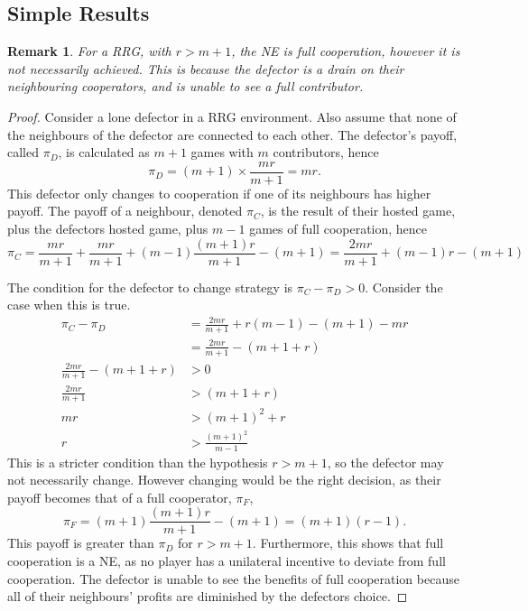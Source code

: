 \subsection{Simple Results}
\newtheorem{remark1}[theorem]{Remark} \label{remark1}
\begin{remark1}
For a RRG, with $r>m+1$, the NE is full cooperation, however it is not necessarily achieved. This is because the defector is a drain on their neighbouring cooperators, and is unable to see a full contributor. 
\end{remark1}
\begin{proof}
Consider a lone defector in a RRG environment. Also assume that none of the neighbours of the defector are connected to each other. The defector's payoff, called $\pi_D$, is calculated as $m+1$ games with $m$ contributors, hence $$\pi_D = (m+1) \times \frac{mr}{m+1} = mr. $$ This defector only changes to cooperation if one of its neighbours has higher payoff. The payoff of a neighbour, denoted $\pi_C$, is the result of their hosted game, plus the defectors hosted game, plus $m-1$ games of full cooperation, hence $$\pi_C = \frac{mr}{m+1}+\frac{mr}{m+1} + (m-1) \frac{(m+1 )r}{m+1} - (m+1) = \frac{2mr}{m+1} +(m-1)r - (m+1) $$ 


The condition for the defector to change strategy is $\pi_C  - \pi_D>0$. Consider the case when this is true. \\
\begin{align*}
    \pi_C - \pi_D &= \frac{2mr}{m+1} +r(m-1) -(m+1)-mr\\
    &= \frac{2mr}{m+1} -(m+1+r)\\
    \frac{2mr}{m+1} -(m+1+r) &> 0\\
    \frac{2mr}{m+1} &>(m+1+r)\\
    mr &>(m+1)^2+r\\
    r&>\frac{(m+1)^2}{m-1}
\end{align*}
This is a stricter condition than the hypothesis $r>m+1$, so the defector may not necessarily change. However changing would be the right decision, as their payoff becomes that of a full cooperator, $\pi_{F}$, $$ \pi_F = (m+1)\frac{(m+1)r}{m+1} - (m+1) = (m+1)(r-1). $$ This payoff is greater than $\pi_D$ for $r>m+1$. Furthermore, this shows that full cooperation is a NE, as no player has a unilateral incentive to deviate from full cooperation. The defector is unable to see the benefits of full cooperation because all of their neighbours' profits are diminished by the defectors choice. \end{proof}

